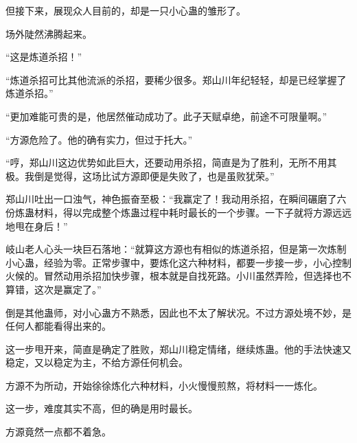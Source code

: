 \begin{this_body}
但接下来，展现众人目前的，却是一只小心蛊的雏形了。

场外陡然沸腾起来。

“这是炼道杀招！”

“炼道杀招可比其他流派的杀招，要稀少很多。郑山川年纪轻轻，却是已经掌握了炼道杀招。”

“更加难能可贵的是，他居然催动成功了。此子天赋卓绝，前途不可限量啊。”

“方源危险了。他的确有实力，但过于托大。”

“哼，郑山川这边优势如此巨大，还要动用杀招，简直是为了胜利，无所不用其极。我倒是觉得，这场比试方源即便是失败了，也是虽败犹荣。”

郑山川吐出一口浊气，神色振奋至极：“我赢定了！我动用杀招，在瞬间碾磨了六份炼蛊材料，得以完成整个炼蛊过程中耗时最长的一个步骤。一下子就将方源远远地甩在身后！”

岐山老人心头一块巨石落地：“就算这方源也有相似的炼道杀招，但是第一次炼制小心蛊，经验为零。正常步骤中，要炼化这六种材料，都要一步接一步，小心控制火候的。冒然动用杀招加快步骤，根本就是自找死路。小川虽然弄险，但选择也不算错，这次是赢定了。”

倒是其他蛊师，对小心蛊方不熟悉，因此也不太了解状况。不过方源处境不妙，是任何人都能看得出来的。

这一步甩开来，简直是确定了胜败，郑山川稳定情绪，继续炼蛊。他的手法快速又稳定，又以稳定为主，不给方源任何机会。

方源不为所动，开始徐徐炼化六种材料，小火慢慢煎熬，将材料一一炼化。

这一步，难度其实不高，但的确是用时最长。

方源竟然一点都不着急。

\end{this_body}

